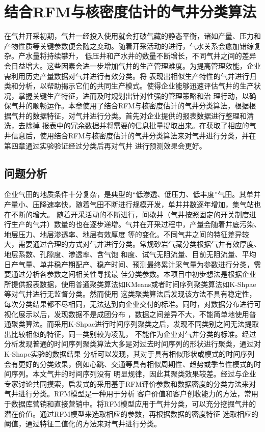 \chapter{结合RFM与核密度估计的气井分类算法}
在气井开采初期，气井一经投入使用就会打破气藏的静态平衡，诸如产量、压力和产物性质等关键参数便会随之变动。随着开采活动的进行，气水关系会愈加错综复杂。产水量将持续攀升，
低压井和产水井的数量不断增长，不同气井之间的差异会日益增大。这些因素会进一步增加气井的生产管理难度。为提高管理效能，企业需利用历史产量数据对气井进行有效分类。将
表现出相似生产特性的气井进行归类和分析，以帮助揭示它们的共同生产模式。使得企业能够迅速评估气井的生产状况，掌握关键生产特征，进而及时规划出针对性强的管理策略和治
理行动，以确保气井的顺畅运作。本章使用了结合RFM与核密度估计的气井分类算法，根据根据气井的数据特征，对气井进行分类。首先对企业提供的报表数据进行整理和清洗，去除掉
报表中的冗余数据并将需要的信息批量提取出来。在获取了相应的气井信息后，使用结合RFM与核密度估计的气井分类算法来对气井进行分类，并在第四章通过实验验证经过分类后再对气井
进行预测效果会更好。
\section{问题分析}
企业气田的地质条件十分复杂，是典型的“低渗透、低压力、低丰度”气田。其单井产量小、压降速率快，随着气田不断进行规模开发，单井井数逐年增加，集气站也在不断的增大。
随着开采活动的不断进行，间歇井（气井按照固定的开关制度进行生产的气井）数量的也在逐步递增。气井在开采过程中，产量会随着井底污染、地层压力、地层渗透率、地层有效厚度
等的变化。不同气井之间的特征差异较大，需要通过合理的方式对气井进行分类。常规砂岩气藏分类根据气井有效厚度、地层系数、孔隙度、渗透率、含气饱
和度、试气无阻流量、目前无阻流量、平均日产气量、单井稳产期配产、稳产时间、预测最终累计采气量为参数进行分类，需要通过分析各参数之间相关性寻找最
佳分类参数。本项目中初步想法是根据企业所提供报表数据，使用普通聚类算法如KMeans或者时间序列聚类算法如K-Shpae等对气井进行无监督分类。然而使用
这类聚类算法后发现该方法不具有稳定性，每次分类结果都不尽相同，无法达到向企业交付的标准。同时，对数据分布进行可视化展示以后，发现数据不是成团分布
，数据之间差异不大，不能简单地使用普通聚类算法。而采用K-Shpae进行时间序列聚类之后，发现不同类别之间无法提取出比较相似的特征，同一类别较为凌乱，
不能作为企业对气井分类的标准。经过分析发现普通的时间序列聚类算法大多是对过去时间序列的形状进行聚类，通过对K-Shape实验的数据结果\cite{Kshapeexperiment}
分析可以发现，其对于具有相似形状或模式的时间序列会有更好的分类效果，例如心跳、交通等具有相似周期性、趋势或季节性模式的时间序列。本文气井的时间序列没有
明显规律，因此其聚类效果较差。经过与企业专家讨论共同摸索，启发式的采用基于RFM\cite{birant2011data}评价参数和数据密度的分类方法来对气井进行分类。RFM模型是一种用于分析
客户价值和客户创收能力的方法，常用于数据库营销和直接营销中。将RFM模型应用于气井分类，可以充分挖掘气井的潜在价值。通过RFM模型来选取相应的参数，再根据数据的密度特征
选取相应的阈值，通过特征二值化的方法来对气井进行分类。

